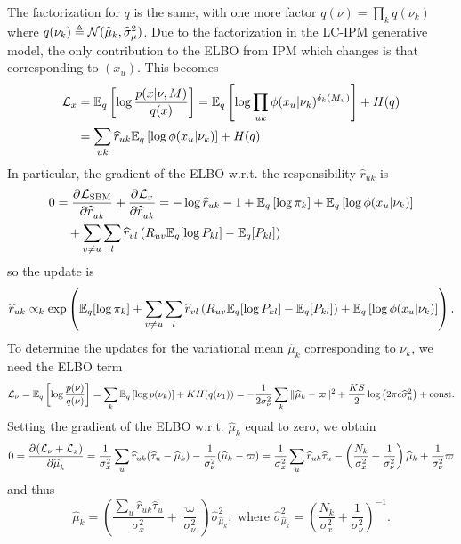 \documentclass{article}
\begin{document}
The factorization for $q$ is the same, with one more factor $q(\nu) = \prod_kq(\nu_k)$ where $q(\nu_k)\triangleq \mathcal{N}(\widehat\mu_k,\widehat\sigma^2_\mu)$. Due to the factorization in the LC-IPM generative model, the only contribution to the ELBO from IPM which changes is that corresponding to $(x_u)$. This becomes%
\begin{align*}
\mathcal{L}_x 
&= \mathbb{E}_q\left[\log \frac{p(x|\nu, M)}{q(x)}\right]
= \mathbb{E}_q\left[\log \prod_{uk}\phi(x_u|\nu_k)^{\delta_k(M_u)}\right] + H(q) \\
&= \sum_{uk}\widehat r_{uk}\mathbb{E}_q\left[\log \phi(x_u|\nu_k)\right] + H(q) 
\end{align*}
In particular, the gradient of the ELBO w.r.t. the responsibility $\widehat r_{uk}$ is
\begin{align*}
0 
&= \frac{\partial^{}\mathcal{L}_\text{SBM}}{\partial \widehat r_{uk}^{}} + \frac{\partial^{}\mathcal{L}_x}{\partial \widehat r_{uk}^{}} 
= -\log \widehat r_{uk} - 1 + \mathbb{E}_q\left[\log \pi_k\right] + \mathbb{E}_q\left[\log \phi(x_u|\nu_k)\right] \\
&~~~+\sum_{v\neq u} \sum_l \widehat r_{vl}\left(R_{uv}\mathbb{E}_q[\log P_{kl}] - \mathbb{E}_q[P_{kl}]\right)
\end{align*}
so the update is
$$
\widehat r_{uk} \propto_k \exp\left(\mathbb{E}_q[\log \pi_k]
+ \sum_{v\neq u} \sum_l \widehat r_{vl}\left(R_{uv}\mathbb{E}_q[\log P_{kl}] - \mathbb{E}_q[P_{kl}]\right)
+ \mathbb{E}_q\left[\log \phi(x_u|\nu_k)\right]\right). 
$$
To determine the updates for the variational mean $\widehat \mu_k$ corresponding to $\nu_k$, we need the ELBO term
$$
\mathcal{L}_\nu 
= \mathbb{E}_q\left[\log \frac{p(\nu)}{q(\nu)}\right]
= \sum_k\mathbb{E}_q\left[\log p(\nu_k)\right] + KH(q(\nu_1))
= -\frac{1}{2\sigma_\nu^2}\sum_k\|\widehat\mu_k-\varpi\|^2 + \frac{KS}{2}\log\left(2\pi e\widehat\sigma^2_\mu\right) + \text{const.}
$$
Setting the gradient of the ELBO w.r.t. $\widehat\mu_k$ equal to zero, we obtain
$$
0
= \frac{\partial^{}(\mathcal{L}_\nu + \mathcal{L}_x)}{\partial \widehat\mu_k^{}}
= \frac{1}{\sigma_x^2}\sum_u\widehat r_{uk}(\widehat\tau_u -\widehat\mu_k)  - \frac{1}{\sigma_\nu^2}(\widehat \mu_k - \varpi)
= \frac{1}{\sigma_x^2}\sum_u\widehat r_{uk}\widehat\tau_u -\left(\frac{N_k}{\sigma_x^2}+\frac{1}{\sigma_\nu^2}\right)\widehat\mu_k + \frac{1}{\sigma_\nu^2}\varpi
$$
and thus
$$
\widehat\mu_k= \left(\frac{\sum_u\widehat r_{uk}\widehat\tau_u}{\sigma_x^2} + \frac{\varpi}{\sigma_\nu^2}\right)\widehat\sigma^2_{\hat\mu_k}; \text{ where }
\widehat\sigma^2_{\hat\mu_k} = \left(\frac{N_k}{\sigma_x^2}+\frac{1}{\sigma_\nu^2}\right)^{-1}.
$$
\end{document}
